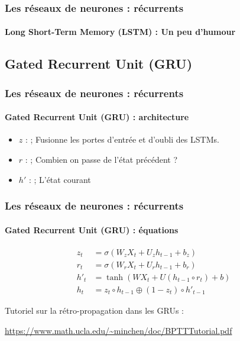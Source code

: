 \documentclass[xcolor=table]{beamer}
\begin{document}
\begin{frame}
\frametitle{Les réseaux de neurones : récurrents}
\framesubtitle{Long Short-Term Memory (LSTM) : Un peu d'humour}

\begin{center}
\end{center}

\end{frame}

\subsection{Gated Recurrent Unit (GRU)}

\begin{frame}
\frametitle{Les réseaux de neurones : récurrents}
\framesubtitle{Gated Recurrent Unit (GRU) : architecture}
	
	\begin{minipage}{0.50\textwidth} 
		\begin{itemize}
			\item $z$ :  ; 
			Fusionne les portes d'entrée et d'oubli des LSTMs.
			\item $r$ :  ; 
			Combien on passe de l'état précédent ?
			\item $h'$ :  ;
			L'état courant	
		\end{itemize}
	\end{minipage}
	\begin{minipage}{0.49\textwidth}
	\end{minipage}
	

\end{frame}

\begin{frame}
	\frametitle{Les réseaux de neurones : récurrents}
	\framesubtitle{Gated Recurrent Unit (GRU) : équations}
	
	\begin{align*}
	z_t &= \sigma(W_z X_t + U_z h_{t-1} + b_z) \\
	r_t &= \sigma(W_r X_t + U_r h_{t-1} + b_r) \\
	h'_t &= \tanh(W X_t + U (h_{t-1} \circ r_t) + b) \\
	h_t &= z_t \circ h_{t-1} \oplus (1-z_t) \circ h'_{t-1}
	\end{align*}
	
	Tutoriel sur la rétro-propagation dans les GRUs :
	
	\url{https://www.math.ucla.edu/~minchen/doc/BPTTTutorial.pdf}
	
\end{frame}
\end{document}
